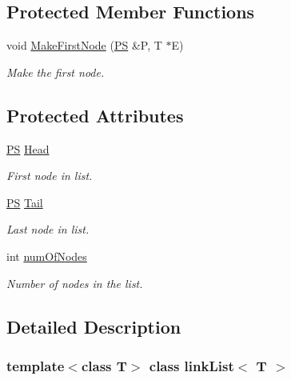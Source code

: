 \subsection*{Protected Member Functions}
\begin{DoxyCompactItemize}
\item 
void \hyperlink{classlink_list_a9e5426ee4036b2eb07b4ce2f20ad07fb}{MakeFirstNode} (\hyperlink{structlink_list_1_1_snode}{PS} \&P, T $\ast$E)
\begin{DoxyCompactList}\small\item\em Make the first node. \item\end{DoxyCompactList}\end{DoxyCompactItemize}
\subsection*{Protected Attributes}
\begin{DoxyCompactItemize}
\item 
\hyperlink{structlink_list_1_1_snode}{PS} \hyperlink{classlink_list_a9a8d0e93011c492561e5bba4ae95499c}{Head}
\begin{DoxyCompactList}\small\item\em First node in list. \item\end{DoxyCompactList}\item 
\hyperlink{structlink_list_1_1_snode}{PS} \hyperlink{classlink_list_ad289602de02c0ccdd7fe1b88c987b810}{Tail}
\begin{DoxyCompactList}\small\item\em Last node in list. \item\end{DoxyCompactList}\item 
int \hyperlink{classlink_list_acf1c40918d12e12d58088ea7377c51e8}{numOfNodes}
\begin{DoxyCompactList}\small\item\em Number of nodes in the list. \item\end{DoxyCompactList}\end{DoxyCompactItemize}


\subsection{Detailed Description}
\subsubsection*{template$<$class T$>$ class linkList$<$ T $>$}

